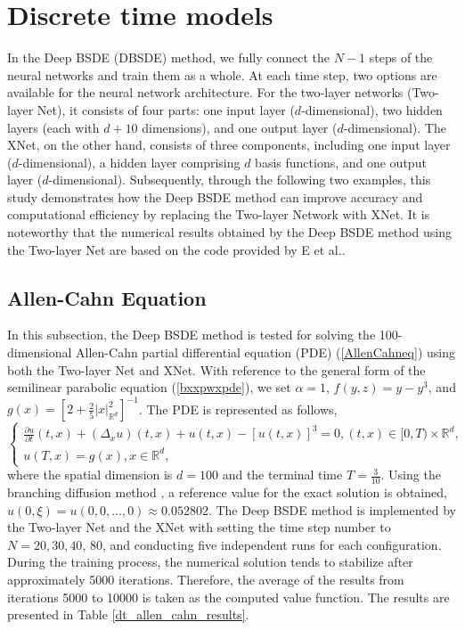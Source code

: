 \documentclass[11pt]{article}
\begin{document}
\section{Discrete time models}\label{s4}
In the Deep BSDE (DBSDE) method, we fully connect the $N-1$ steps of the neural networks and train them as a whole. At each time step, two options are available for the neural network architecture. 
For the two-layer networks (Two-layer Net), it consists of four parts: one input layer ($d$-dimensional), two hidden layers (each with $d+10$ dimensions), and one output layer ($d$-dimensional). 
The XNet, on the other hand, consists of three components, including one input layer ($d$-dimensional), a hidden layer comprising $d$ basis functions, and one output layer ($d$-dimensional). 
Subsequently, through the following two examples, this study demonstrates how the Deep BSDE method can improve accuracy and computational efficiency by replacing the Two-layer Network with XNet. It is noteworthy that the numerical results obtained by the Deep BSDE method using the Two-layer Net are based on the code provided by E et al.\textsuperscript{\cite{E2017}}.

\subsection{Allen-Cahn Equation}
In this subsection, the Deep BSDE method is tested for solving the 100-dimensional Allen-Cahn partial differential equation (PDE) (\ref{AllenCahneq}) using both the Two-layer Net and XNet. With reference to the general form of the semilinear parabolic equation (\ref{bxxpwxpde}), we set $\alpha=1$, $f(y,z) = y - y^3$, and $g(x) = \left[2 + \frac{2}{5} |x|_{\mathbb{R}^d}^2\right]^{-1}$. The PDE is represented as follows,
\begin{equation}\label{AllenCahneq}
	\left\{\begin{array}{l}
		\frac{\partial u}{\partial t}(t, x)+\left(\Delta_x u\right)(t, x)+u(t, x)-[u(t, x)]^3=0,(t, x) \in[0, T) \times \mathbb{R}^d, \\
		u(T, x)=g(x), x \in \mathbb{R}^d,
	\end{array}\right.
\end{equation}
where the spatial dimension is $d=100$ and the terminal time $T=\frac{3}{10}$. Using the branching diffusion method \textsuperscript{\cite{FENZHI1,FENZHI2,FENZHI3}}, a reference value for the exact solution is obtained, $u(0, \xi)=u(0,0, \ldots, 0)\approx 0.052802$. 
The Deep BSDE method is implemented by the Two-layer Net and the XNet with setting the time step number to $N=20, 30, 40$, $80$, and conducting five independent runs for each configuration. During the training process, the numerical solution tends to stabilize after approximately 5000 iterations. Therefore, the average of the results from iterations 5000 to 10000 is taken as the computed value function. The results are presented in Table \ref{dt_allen_cahn_results}.
\end{document}
